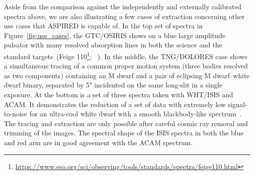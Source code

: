 \documentclass[linenumbers, twocolumn]{aastex631}
\begin{document}
Aside from the comparison against the independently and externally calibrated
spectra above, we are also illustrating a few cases of extraction concerning
other use cases that \textsc{ASPIRED} is capable of. In the top set of spectra
in Figure~\ref{fig:use_cases}, the GTC/OSIRIS shows on a blue large amplitude
pulsator with many resolved absorption lines in both the science and the
standard targets~(Feige 110\footnote{
\url{https://www.eso.org/sci/observing/tools/standards/spectra/feige110.html}};
~\citealp{2022MNRAS.511.4971M}). In the middle, the TNG/DOLORES case shows a
simultaneous tracing of a common proper motion system (three bodies resolved
as two components) containing an M dwarf and a pair of eclipsing
M dwarf--white dwarf binary, separated by 5" incidented on the same long-slit
in a single exposure. At the bottom is a set of three spectra taken
with WHT/ISIS and ACAM. It demonstrates the reduction of a set of data with
extremely low signal-to-noise for an ultra-cool white dwarf with a smooth
blackbody-like spectrum~\citep{2020MNRAS.493.6001L}. The tracing and extraction
are only possible after careful cosmic ray removal and trimming of the images.
The spectral shape of the ISIS spectra in both the blue and red arm are in good
agreement with the ACAM spectrum.
\end{document}
